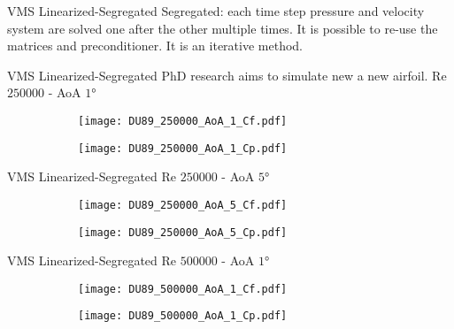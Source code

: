 \begin{frame}{VMS Linearized-Segregated}
Segregated: each time step pressure and velocity system are solved one after the other multiple times. It is possible to re-use the matrices and preconditioner. It is an iterative method.

\end{frame}




\begin{frame}{VMS Linearized-Segregated}
PhD research aims to simulate new a new airfoil.
Re $\num{250000}$ - AoA $\ang{1}$ 

\begin{figure}[h]
     \centering          
     \begin{subfigure}[h]{0.45\textwidth}
              \centering
         \texttt{[image: DU89\_250000\_AoA\_1\_Cf.pdf]}
    \end{subfigure}
          \hfill
     \begin{subfigure}[h]{0.45\textwidth}
      \centering
         \texttt{[image: DU89\_250000\_AoA\_1\_Cp.pdf]}
     \end{subfigure}
     \end{figure} 
 \end{frame}

\begin{frame}{VMS Linearized-Segregated}
Re $\num{250000}$ - AoA $\ang{5}$ 
\begin{figure}[h]
     \centering          
     \begin{subfigure}[h]{0.45\textwidth}
              \centering
         \texttt{[image: DU89\_250000\_AoA\_5\_Cf.pdf]}
    \end{subfigure}
          \hfill
     \begin{subfigure}[h]{0.45\textwidth}
      \centering
         \texttt{[image: DU89\_250000\_AoA\_5\_Cp.pdf]}
     \end{subfigure}
     \end{figure} 
 \end{frame}

\begin{frame}{VMS Linearized-Segregated}
Re $\num{500000}$ - AoA $\ang{1}$ 
\begin{figure}[h]
     \centering          
     \begin{subfigure}[h]{0.45\textwidth}
              \centering
         \texttt{[image: DU89\_500000\_AoA\_1\_Cf.pdf]}
    \end{subfigure}
          \hfill
     \begin{subfigure}[h]{0.45\textwidth}
      \centering
         \texttt{[image: DU89\_500000\_AoA\_1\_Cp.pdf]}
     \end{subfigure}
     \end{figure} 
 \end{frame}

